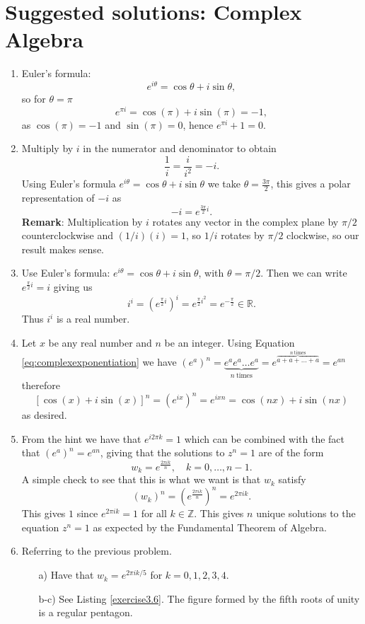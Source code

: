 \newpage
\section{Suggested solutions: Complex Algebra}
\begin{enumerate}

\item Euler's formula:
$$e^{i\theta}=\cos\theta+i\sin\theta,$$
so for $\theta=\pi$
$$e^{\pi i}=\cos(\pi)+i\sin(\pi)=-1,$$
as $\cos(\pi)=-1$ and $\sin(\pi)=0$, hence $e^{\pi i}+1=0$. 

\item Multiply by $i$ in the numerator and denominator to obtain
$$\frac{1}{i}=\frac{i}{i^{2}}=-i.$$
Using Euler's formula $e^{i\theta}=\cos\theta+i\sin\theta$ we take $\theta=\frac{3\pi}{2}$, this gives a polar representation of $-i$ as
$$-i=e^{\frac{3\pi}{2}i}.$$
\textbf{Remark}: Multiplication by $i$ rotates any vector in the complex plane by $\pi/2$ counterclockwise and $(1/i)(i)=1$, so $1/i$ rotates by $\pi/2$ clockwise, so our result makes sense. 

\item Use Euler's formula: $e^{i\theta}=\cos\theta+i\sin\theta$, with $\theta=\pi/2$. Then we can write $e^{\frac{\pi}{2}i}=i$ giving us
$$i^{i}=(e^{\frac{\pi}{2}i})^{i}=e^{\frac{\pi}{2}i^{2}}=e^{-\frac{\pi}{2}}\in\mathbb{R}.$$
Thus $i^{i}$ is a real number. 

\item Let $x$ be any real number and $n$ be an integer. Using Equation \ref{eq:complexexponentiation} we have $(e^{a})^{n}=\underbrace{e^{a}e^{a}\hdots e^{a}}_{n\ \text{times}}=e^{\overbrace{a+a+\hdots+a}^{n\ \text{times}}}=e^{an}$ therefore 
$$[\cos(x)+i\sin(x)]^{n}=(e^{ix})^{n}=e^{ixn}=\cos(nx)+i\sin(nx)$$
as desired. 

\item From the hint we have that $e^{i2\pi k}=1$ which can be combined with the fact that $(e^{a})^{n}=e^{an}$, giving that the solutions to $z^{n}=1$ are of the form
$$w_{k}=e^{\frac{2\pi i k}{n}}, \quad k=0,\hdots,n-1.$$
A simple check to see that this is what we want is that $w_{k}$ satisfy
$$(w_{k})^{n}=(e^{\frac{2\pi ik}{n}})^{n}=e^{2\pi ik}.$$
This gives $1$ since $e^{2\pi ik}=1$ for all $k\in\mathbb{Z}$. This gives $n$ unique solutions to the equation $z^{n}=1$ as expected by the Fundamental Theorem of Algebra.  

\item Referring to the previous problem.
\begin{itemize}
    \item[a)] Have that $w_{k}=e^{2\pi ik/5}$ for $k=0,1,2,3,4$. 
    \item[b-c)] See Listing \ref{exercise3.6}. The figure formed by the fifth roots of unity is a regular pentagon. 
\end{itemize}


\end{enumerate}
